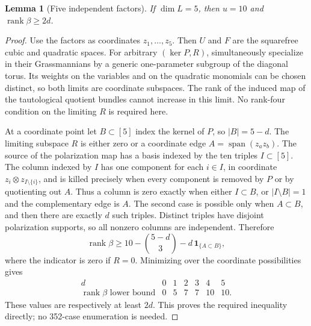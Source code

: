 \documentclass[11pt]{amsart}
\newtheorem{lemma}[theorem]{Lemma}
\theoremstyle{definition}
\numberwithin{equation}{section}
\newcommand{\Span}{\operatorname{span}}
\newcommand{\rank}{\operatorname{rank}}
\begin{document}
\begin{lemma}[Five independent factors]\label{lem:independent}
If \(\dim L=5\), then \(u=10\) and \(\rank\beta\ge2d\).
\end{lemma}
\begin{proof}
Use the factors as coordinates \(z_1,\ldots,z_5\). Then \(U\) and \(F\)
are the squarefree cubic and quadratic spaces. For arbitrary
\((\ker P,R)\), simultaneously specialize in their Grassmannians by a
generic one-parameter subgroup of the diagonal torus. Its weights on the
variables and on the quadratic monomials can be chosen distinct, so both
limits are coordinate subspaces. The rank of the induced map of the
tautological quotient bundles cannot increase in this limit.
No rank-four condition on the limiting \(R\) is required here.

At a coordinate point let \(B\subset[5]\) index the kernel of \(P\),
so \(|B|=5-d\). The limiting subspace \(R\) is either zero or a
coordinate edge \(A=\Span(z_az_b)\). The source of the polarization map
has a basis indexed by the ten triples \(I\subset[5]\). The column indexed
by \(I\) has one component for each \(i\in I\), in coordinate
\(z_i\otimes z_{I\setminus\{i\}}\), and is killed precisely when every
component is removed by \(P\) or by quotienting out \(A\). Thus a column
is zero exactly when either \(I\subset B\), or \(|I\setminus B|=1\)
and the complementary edge is \(A\). The second case is possible only
when \(A\subset B\), and then there are exactly \(d\) such triples.
Distinct triples have disjoint polarization supports, so all nonzero
columns are independent. Therefore
\[
 \rank\beta\ge 10-\binom{5-d}{3}
       -d\,\mathbf1_{\{A\subset B\}},
\]
where the indicator is zero if \(R=0\). Minimizing over the coordinate
possibilities gives
\[
\begin{array}{c|rrrrrr}
d&0&1&2&3&4&5\\\hline
\rank\beta\text{ lower bound}&0&5&7&7&10&10.
\end{array}
\]
These values are respectively at least \(2d\). This proves the required
inequality directly; no 352-case enumeration is needed.
\end{proof}
\end{document}
